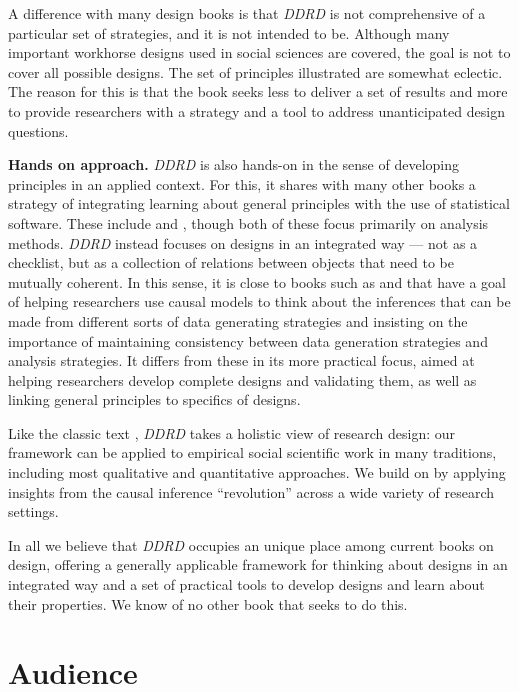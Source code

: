 \documentclass[11pt]{article}
\begin{document}
A difference with many design books is that \textit{DDRD} is not comprehensive of a particular set of strategies, and it is not intended to be. Although many important workhorse designs used in social sciences are covered, the goal is not to cover all possible designs. The set of principles illustrated are somewhat eclectic. The reason for this is that the book seeks less to deliver a set of results and more to provide researchers with a strategy and a tool to address unanticipated design questions.  

\textbf{Hands on approach.} \textit{DDRD} is also hands-on in the sense of developing principles in an applied context. For this, it shares with many other books a strategy of integrating learning about general principles with the use of statistical software. These include \citet{gelman2006data} and  \citet{james2014introduction}, though both of these focus primarily on analysis methods.  
\textit{DDRD} instead focuses on designs in an integrated way --- not as a checklist, but as a collection of relations between objects that need to be mutually coherent. In this sense, it is close to books such as \citet{Gerber2012} and \citet{dunning2012natural} that have a goal of helping researchers use causal models to think about the inferences that can be made from different sorts of data generating strategies and insisting on the importance of maintaining consistency between data generation strategies and analysis strategies. It differs from these in its more practical focus, aimed at helping researchers develop complete designs and validating them, as well as linking general principles to specifics of designs. 

Like the classic text \citet{king1994designing}, \textit{DDRD} takes a holistic view of research design: our framework can be applied to empirical social scientific work in many traditions, including most qualitative and quantitative approaches. We build on \citet{king1994designing} by applying insights from the causal inference ``revolution'' across a wide variety of research settings.

In all we believe that \textit{DDRD} occupies an unique place among current books on design, offering a generally applicable framework for thinking about designs in an integrated way and a set of practical tools to develop designs and learn about their properties. We know of no other book that seeks to do this.

\clearpage
\section{Audience}
\end{document}
